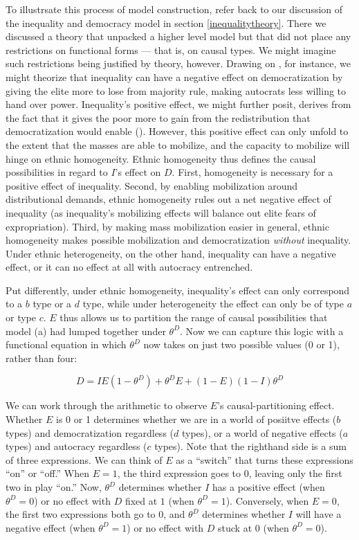 \documentclass[
  12pt,
]{book}
\begin{document}
To illustrsate this process of model construction, refer back to our discussion of the inequality and democracy model in section \ref{inequalitytheory}. There we discussed a theory that unpacked a higher level model but that did not place any restrictions on functional forms --- that is, on causal types. We might imagine such restrictions being justified by theory, however.
Drawing on \citet{boix2003democracy}, for instance, we might theorize that inequality can have a negative effect on democratization by giving the elite more to lose from majority rule, making autocrats less willing to hand over power. Inequality's positive effect, we might further posit, derives from the fact that it gives the poor more to gain from the redistribution that democratization would enable (\citet{acemoglu2005economic}). However, this positive effect can only unfold to the extent that the masses are able to mobilize, and the capacity to mobilize will hinge on ethnic homogeneity. Ethnic homogeneity thus defines the causal possibilities in regard to \(I\)'s effect on \(D\). First, homogeneity is necessary for a positive effect of inequality. Second, by enabling mobilization around distributional demands, ethnic homogeneity rules out a net negative effect of inequality (as inequality's mobilizing effects will balance out elite fears of expropriation). Third, by making mass mobilization easier in general, ethnic homogeneity makes possible mobilization and democratization \emph{without} inequality. Under ethnic heterogeneity, on the other hand, inequality can have a negative effect, or it can no effect at all with autocracy entrenched.

Put differently, under ethnic homogeneity, inequality's effect can only correspond to a \(b\) type or a \(d\) type, while under heterogeneity the effect can only be of type \(a\) or type \(c\). \(E\) thus allows us to partition the range of causal possibilities that model (a) had lumped together under \(\theta^D\). Now we can capture this logic with a functional equation in which \(\theta^D\) now takes on just two possible values (0 or 1), rather than four:

\begin{equation}
D=IE(1-\theta^D)+\theta^DE+(1-E)(1-I)\theta^D
\end{equation}

We can work through the arithmetic to observe \(E\)'s causal-partitioning effect. Whether \(E\) is 0 or 1 determines whether we are in a world of posiitve effects (\(b\) types) and democratization regardless (\(d\) types), or a world of negative effects (\(a\) types) and autocracy regardless (\(c\) types). Note that the righthand side is a sum of three expressions. We can think of \(E\) as a ``switch'' that turns these expressions ``on'' or ``off.'' When \(E=1\), the third expression goes to 0, leaving only the first two in play ``on.'' Now, \(\theta^D\) determines whether \(I\) has a positive effect (when \(\theta^D=0\)) or no effect with \(D\) fixed at \(1\) (when \(\theta^D=1\)). Conversely, when \(E=0\), the first two expressions both go to \(0\), and \(\theta^D\) determines whether \(I\) will have a negative effect (when \(\theta^D=1\)) or no effect with \(D\) stuck at 0 (when \(\theta^D=0\)).
\end{document}
